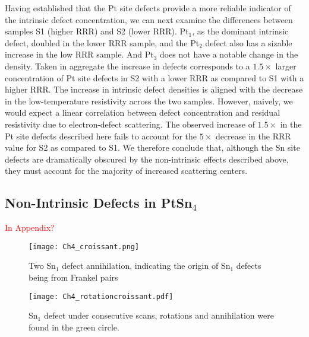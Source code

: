 \par Having established that the Pt site defects provide a more reliable indicator of the intrinsic defect concentration, we can next examine the differences between samples S1 (higher RRR) and S2 (lower RRR). Pt$_1$, as the dominant intrinsic defect, doubled in the lower RRR sample, and the Pt$_2$ defect also has a sizable increase in the low RRR sample. And Pt$_3$ does not have a notable change in the density. Taken in aggregate the increase in defects corresponds to a $1.5\times$ larger concentration of Pt site defects in S2 with a lower RRR as compared to S1 with a higher RRR.  The increase in intrinsic defect densities is aligned with the decrease in the low-temperature resistivity across the two samples. However, naively, we would expect a linear correlation between defect concentration and residual resistivity due to electron-defect scattering. The observed increase of $1.5\times$ in the Pt site defects described here fails to account for the $5\times$ decrease in the RRR value for S2 as compared to S1. We therefore conclude that, although the Sn site defects are dramatically obscured by the non-intrinsic effects described above, they must account for the majority of increased scattering centers. 

\subsection{Non-Intrinsic Defects in PtSn$_4$} \textcolor{red}{In Appendix?}

\begin{figure}
	\centering
	\texttt{[image: Ch4\_croissant.png]}
	\caption{Two Sn$_1$ defect annihilation, indicating the origin of Sn$_1$ defects being from Frankel pairs}
	\label{fig:Ch4_croissantannihilation}
\end{figure}

\begin{figure}
	\centering
	\texttt{[image: Ch4\_rotationcroissant.pdf]}
	\caption{Sn$_1$ defect under consecutive scans, rotations and annihilation were found in the green circle.}
	\label{fig:Ch4_rotationcroissant}
\end{figure}

